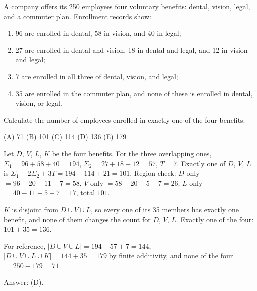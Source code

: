 \begin{example}
A company offers its 250 employees four voluntary benefits: dental, vision, legal,
and a commuter plan. Enrollment records show:
\begin{enumerate}[nosep,label=(\roman*)]
  \item 96 are enrolled in dental, 58 in vision, and 40 in legal;
  \item 27 are enrolled in dental and vision, 18 in dental and legal, and 12 in
        vision and legal;
  \item 7 are enrolled in all three of dental, vision, and legal;
  \item 35 are enrolled in the commuter plan, and none of these is enrolled in
        dental, vision, or legal.
\end{enumerate}
Calculate the number of employees enrolled in exactly one of the four benefits.

(A) 71 \qquad (B) 101 \qquad (C) 114 \qquad (D) 136 \qquad (E) 179
\end{example}
\begin{solution}
Let $D$, $V$, $L$, $K$ be the four benefits. For the three overlapping ones,
$\Sigma_1 = 96 + 58 + 40 = 194$, $\Sigma_2 = 27 + 18 + 12 = 57$, $T = 7$.
Exactly one of $D$, $V$, $L$ is $\Sigma_1 - 2\Sigma_2 + 3T = 194 - 114 + 21 = 101$.
Region check: $D$ only $= 96 - 20 - 11 - 7 = 58$, $V$ only $= 58 - 20 - 5 - 7 = 26$,
$L$ only $= 40 - 11 - 5 - 7 = 17$, total $101$.

$K$ is disjoint from $D \cup V \cup L$, so every one of its 35 members has exactly one
benefit, and none of them changes the count for $D$, $V$, $L$. Exactly one of the
four: $101 + 35 = 136$.

For reference, $|D \cup V \cup L| = 194 - 57 + 7 = 144$, $|D\cup V\cup L\cup K| = 144 + 35 = 179$
by finite additivity, and none of the four $= 250 - 179 = 71$.

Answer: (D).
\end{solution}

